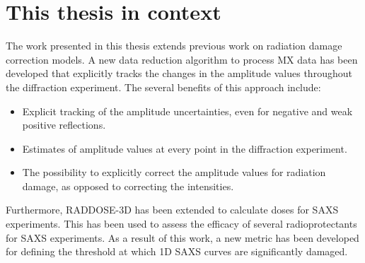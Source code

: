 \section{This thesis in context}
\label{sec:This thesis in context}
	The work presented in this thesis extends previous work on radiation damage correction models.
	A new data reduction algorithm to process MX data has been developed that explicitly tracks the changes in the amplitude values throughout the diffraction experiment.
	The several benefits of this approach include:
    \begin{itemize}
        \item Explicit tracking of the amplitude uncertainties, even for negative and weak positive reflections.
		\item Estimates of amplitude values at every point in the diffraction experiment.
		\item The possibility to explicitly correct the amplitude values for radiation damage, as opposed to correcting the intensities.
    \end{itemize}
	Furthermore, RADDOSE-3D has been extended to calculate doses for SAXS experiments.
	This has been used to assess the efficacy of several radioprotectants for SAXS experiments.
	As a result of this work, a new metric has been developed for defining the threshold at which 1D SAXS curves are significantly damaged.
